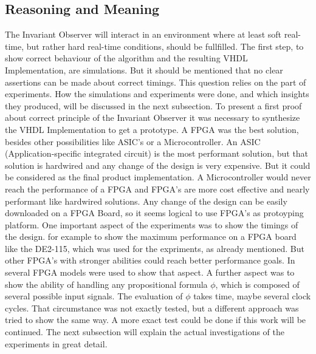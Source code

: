 \subsection{Reasoning and Meaning}
\label{chapter:4:section:1:subsection:1}
The Invariant Observer will interact in an environment where at least soft real-time, but rather hard real-time conditions, should be fullfilled.
The first step, to show  correct behaviour of the algorithm and the resulting VHDL Implementation, are simulations. But it should be mentioned that no 
clear assertions can be made about correct timings. This question relies on the part of experiments. How the simulations and experiments were done, and which insights
they produced, will be discussed in the next subsection.
To present a first proof about correct principle of the Invariant Observer it was necessary to synthesize the VHDL Implementation to get a prototype.
A FPGA was the best solution, besides other possibilities like ASIC's or a Microcontroller. An ASIC (Application-specific integrated circuit) is the most performant solution, but
that solution is hardwired and any change of the design is very expensive. But it could be considered as the final product implementation.
A Microcontroller would never reach the performance of a FPGA and FPGA's are more cost effective and nearly performant like hardwired solutions. 
Any change of the design can be easily downloaded on a FPGA Board, so it seems logical to use FPGA's as protoyping platform.
One important aspect of the experiments was to show the timings of the design. 
for example to show the maximum performance on a FPGA board like the DE2-115, which was used for the expriments, as already mentioned.
But other FPGA's with stronger abilities could reach better performance goals. In \cite{RTFMBJ13} several FPGA models were used to show that aspect.      
A further aspect was to show the ability of handling any propositional formula $\phi$, which is composed of several possible input signals.
The evaluation of $\phi$ takes time, maybe several clock cycles. That circumstance was not exactly tested, but a different approach was
tried to show the same way. A more exact test could be done if this work will be continued.
The next subsection will explain the actual investigations of the experiments in great detail.  
